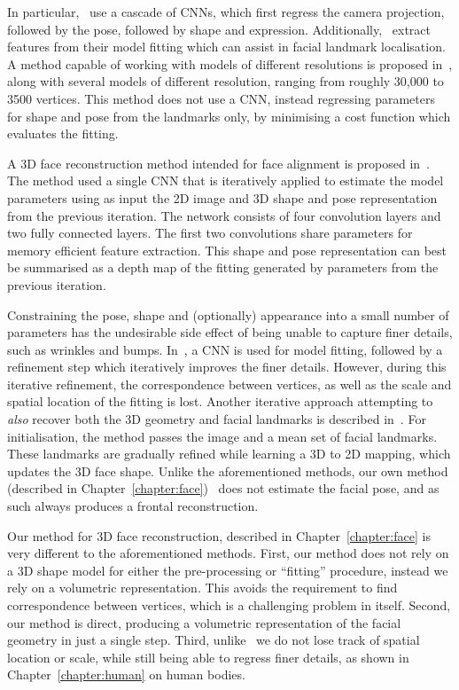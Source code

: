 In particular,~\cite{jourabloo2016large} use a cascade of CNNs, which
first regress the camera projection, followed by the pose, followed by
shape and expression. Additionally,~\cite{jourabloo2016large} extract
features from their model fitting which can assist in facial landmark
localisation. A method capable of working with models of different
resolutions is proposed in~\cite{huber2016multiresolution}, along with
several models of different resolution, ranging from roughly 30,000 to
3500 vertices. This method does not use a CNN, instead regressing
parameters for shape and pose from the landmarks only, by minimising a
cost function which evaluates the fitting.

A 3D face reconstruction method intended for face alignment is
proposed in~\cite{zhu2016face}. The method used a single CNN that is
iteratively applied to estimate the model parameters using as input
the 2D image and 3D shape and pose representation from the previous
iteration. The network consists of four convolution layers and two
fully connected layers. The first two convolutions share parameters
for memory efficient feature extraction. This shape and pose
representation can best be summarised as a depth map of the fitting
generated by parameters from the previous iteration.

Constraining the pose, shape and (optionally) appearance into a small
number of parameters has the undesirable side effect of being unable
to capture finer details, such as wrinkles and
bumps. In~\cite{tran2018extreme}, a CNN is used for model fitting,
followed by a refinement step which iteratively improves the finer
details. However, during this iterative refinement, the correspondence
between vertices, as well as the scale and spatial location of the
fitting is lost. Another iterative approach attempting to
\textit{also} recover both the 3D geometry and facial landmarks is
described in~\cite{liu2016joint}. For initialisation, the method
passes the image and a mean set of facial landmarks. These landmarks
are gradually refined while learning a 3D to 2D mapping, which updates
the 3D face shape. Unlike the aforementioned methods, our own method
(described in Chapter~\ref{chapter:face})~\cite{liu2016joint} does not
estimate the facial pose, and as such always produces a frontal
reconstruction.

Our method for 3D face reconstruction, described in
Chapter~\ref{chapter:face} is very different to the aforementioned
methods. First, our method does not rely on a 3D shape model for
either the pre-processing or ``fitting'' procedure, instead we rely on
a volumetric representation. This avoids the requirement to find
correspondence between vertices, which is a challenging problem in
itself. Second, our method is direct, producing a volumetric
representation of the facial geometry in just a single step. Third,
unlike~\cite{tran2018extreme} we do not lose track of spatial location
or scale, while still being able to regress finer details, as shown in
Chapter~\ref{chapter:human} on human bodies.



